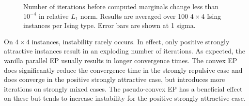 \documentclass[times, 10pt,twocolumn]{article}
\begin{document}
\begin{figure}[h!]
	\caption{Number of iterations before computed marginals change less than $10^{-4}$ in relative $L_1$ norm. Results are averaged over 100 $4 \times 4$ Ising instances per Ising type. Error bars are shown at 1 sigma.}
	\label{44conv}
\end{figure}

On $4 \times 4$ instances, instability rarely occurs. In effect, only positive strongly attractive instances result in an exploding number of iterations. As expected, the vanilla parallel EP usually results in longer convergence times. The convex EP does significantly reduce the convergence time in the strongly repulsive case and does converge in the positive strongly attractive case, but introduces more iterations on strongly mixed cases. The pseudo-convex EP has a beneficial effect on these but tends to increase instability for the positive strongly attractive case.
\end{document}
